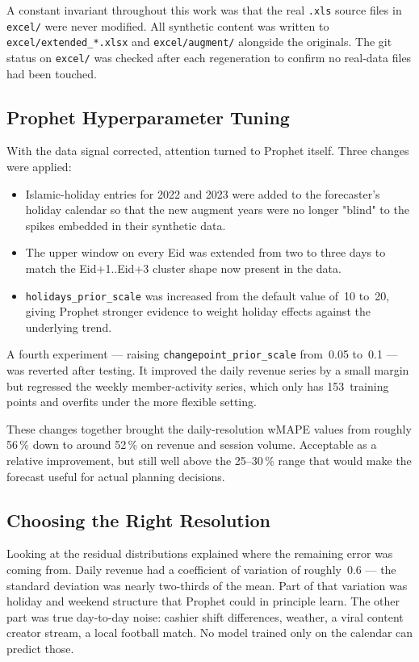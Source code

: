 A constant invariant throughout this work was that the real \texttt{.xls}
source files in \texttt{excel/} were never modified. All synthetic content
was written to \texttt{excel/extended\_*.xlsx} and \texttt{excel/augment/}
alongside the originals. The git status on \texttt{excel/} was checked after
each regeneration to confirm no real-data files had been touched.

\subsection{Prophet Hyperparameter Tuning}

With the data signal corrected, attention turned to Prophet itself. Three
changes were applied:

\begin{itemize}
  \item Islamic-holiday entries for 2022 and 2023 were added to the
        forecaster's holiday calendar so that the new augment years were
        no longer "blind" to the spikes embedded in their synthetic data.
  \item The upper window on every Eid was extended from two to three days
        to match the Eid+1..Eid+3 cluster shape now present in the data.
  \item \texttt{holidays\_prior\_scale} was increased from the default value
        of~10 to~20, giving Prophet stronger evidence to weight holiday
        effects against the underlying trend.
\end{itemize}

A fourth experiment --- raising \texttt{changepoint\_prior\_scale} from~0.05
to~0.1 --- was reverted after testing. It improved the daily revenue series
by a small margin but regressed the weekly member-activity series, which only
has 153~training points and overfits under the more flexible setting.

These changes together brought the daily-resolution wMAPE values from roughly
56\,\% down to around 52\,\% on revenue and session volume. Acceptable as a
relative improvement, but still well above the 25--30\,\% range that would
make the forecast useful for actual planning decisions.

\subsection{Choosing the Right Resolution}

Looking at the residual distributions explained where the remaining error was
coming from. Daily revenue had a coefficient of variation of roughly~0.6 ---
the standard deviation was nearly two-thirds of the mean. Part of that
variation was holiday and weekend structure that Prophet could in principle
learn. The other part was true day-to-day noise: cashier shift differences,
weather, a viral content creator stream, a local football match. No model
trained only on the calendar can predict those.

